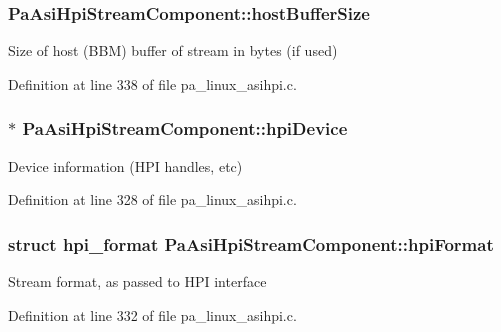 \subsubsection[{\texorpdfstring{host\+Buffer\+Size}{hostBufferSize}}]{ Pa\+Asi\+Hpi\+Stream\+Component\+::host\+Buffer\+Size}\hypertarget{struct_pa_asi_hpi_stream_component_a2e74e02676b12b73cec01f0d4b3a9d32}{}\label{struct_pa_asi_hpi_stream_component_a2e74e02676b12b73cec01f0d4b3a9d32}
Size of host (B\+BM) buffer of stream in bytes (if used) 

Definition at line 338 of file pa\+\_\+linux\+\_\+asihpi.\+c.

\subsubsection[{\texorpdfstring{hpi\+Device}{hpiDevice}}]{$\ast$ Pa\+Asi\+Hpi\+Stream\+Component\+::hpi\+Device}\hypertarget{struct_pa_asi_hpi_stream_component_a1c84299c224c375c465b4e75bfce17f4}{}\label{struct_pa_asi_hpi_stream_component_a1c84299c224c375c465b4e75bfce17f4}
Device information (H\+PI handles, etc) 

Definition at line 328 of file pa\+\_\+linux\+\_\+asihpi.\+c.

\subsubsection[{\texorpdfstring{hpi\+Format}{hpiFormat}}]{\setlength{\rightskip}{0pt plus 5cm}struct hpi\+\_\+format Pa\+Asi\+Hpi\+Stream\+Component\+::hpi\+Format}\hypertarget{struct_pa_asi_hpi_stream_component_a7728064372425eaee08c70bbe936b891}{}\label{struct_pa_asi_hpi_stream_component_a7728064372425eaee08c70bbe936b891}
Stream format, as passed to H\+PI interface 

Definition at line 332 of file pa\+\_\+linux\+\_\+asihpi.\+c.

